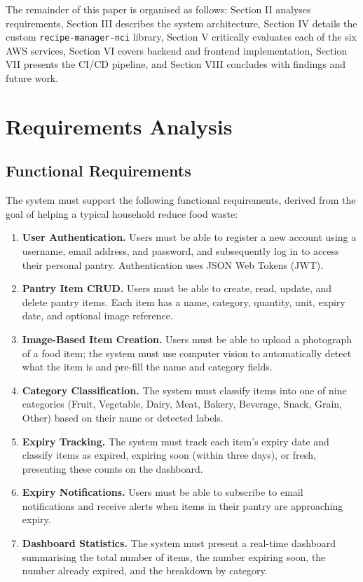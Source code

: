 \documentclass[conference]{IEEEtran}
\begin{document}
The remainder of this paper is organised as follows: Section II analyses requirements, Section III describes the system architecture, Section IV details the custom \texttt{recipe-manager-nci} library, Section V critically evaluates each of the six AWS services, Section VI covers backend and frontend implementation, Section VII presents the CI/CD pipeline, and Section VIII concludes with findings and future work.

\section{Requirements Analysis}

\subsection{Functional Requirements}

The system must support the following functional requirements, derived from the goal of helping a typical household reduce food waste:

\begin{enumerate}
    \item \textbf{User Authentication.} Users must be able to register a new account using a username, email address, and password, and subsequently log in to access their personal pantry. Authentication uses JSON Web Tokens (JWT).
    \item \textbf{Pantry Item CRUD.} Users must be able to create, read, update, and delete pantry items. Each item has a name, category, quantity, unit, expiry date, and optional image reference.
    \item \textbf{Image-Based Item Creation.} Users must be able to upload a photograph of a food item; the system must use computer vision to automatically detect what the item is and pre-fill the name and category fields.
    \item \textbf{Category Classification.} The system must classify items into one of nine categories (Fruit, Vegetable, Dairy, Meat, Bakery, Beverage, Snack, Grain, Other) based on their name or detected labels.
    \item \textbf{Expiry Tracking.} The system must track each item's expiry date and classify items as expired, expiring soon (within three days), or fresh, presenting these counts on the dashboard.
    \item \textbf{Expiry Notifications.} Users must be able to subscribe to email notifications and receive alerts when items in their pantry are approaching expiry.
    \item \textbf{Dashboard Statistics.} The system must present a real-time dashboard summarising the total number of items, the number expiring soon, the number already expired, and the breakdown by category.
\end{enumerate}
\end{document}
